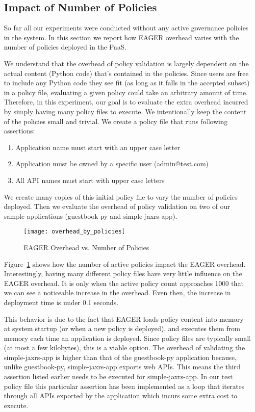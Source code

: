 \subsection{Impact of Number of Policies}

So far all our experiments were conducted without any active governance policies in the system. In this section we report how EAGER overhead
varies with the number of policies deployed in the PaaS. 

We understand that the overhead of policy validation is largely dependent
on the actual content (Python code) that's contained in the policies. Since users are free to include any Python code they see fit (as long as it
falls in the accepted subset) in a policy file, evaluating a given policy could take an arbitrary amount of time. Therefore, in this experiment, our
goal is to evaluate the extra overhead incurred by simply having many policy files to execute. We intentionally keep the content of the policies
small and trivial. We create a policy file that runs following assertions:
\begin{enumerate}
\item Application name must start with an upper case letter
\item Application must be owned by a specific user (admin@test.com)
\item All API names must start with upper case letters
\end{enumerate}
We create many copies of this initial policy file to vary the number of policies deployed. Then we evaluate the overhead of policy validation
on two of our sample applications (guestbook-py and simple-jaxrs-app). 

\begin{figure}
\centering
\texttt{[image: overhead\_by\_policies]}
\caption{EAGER Overhead vs. Number of Policies}
\label{fig:overhead_by_policies}
\end{figure}

Figure~\ref{fig:overhead_by_policies} shows how the number of active policies impact the EAGER overhead. Interestingly, having many
different policy files have very little influence on the EAGER overhead. It is only when the active policy count approaches 1000 that we
can see a noticeable increase in the overhead. Even then, the increase in deployment time is under 0.1 seconds. 

This behavior is due to the fact that EAGER loads policy content into memory at system
startup (or when a new policy is deployed), and executes them from memory each time an application is deployed. Since policy files are 
typically small (at most a few kilobytes), this is a viable option. The overhead of validating the simple-jaxrs-app is higher than that of the
guestbook-py application because, unlike guestbook-py, simple-jaxrs-app exports web APIs. This means the third assertion listed earlier
needs to be executed for simple-jaxrs-app. In our test policy file this particular assertion has been implemented as a loop that iterates through 
all APIs exported by the application which incurs some extra cost to execute.

